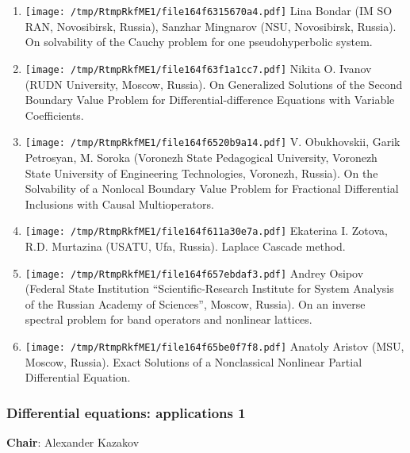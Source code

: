 \documentclass[
]{article}
\providecommand{\tightlist}{%
  \setlength{\itemsep}{0pt}\setlength{\parskip}{0pt}}
\begin{document}
\begin{enumerate}
\def\labelenumi{\arabic{enumi}.}
\tightlist
\item
  \protect\texttt{[image: /tmp/RtmpRkfME1/file164f6315670a4.pdf]}
  Lina Bondar (IM SO RAN, Novosibirsk, Russia), Sanzhar Mingnarov (NSU,
  Novosibirsk, Russia). On solvability of the Cauchy problem for one
  pseudohyperbolic system.
\item
  \protect\texttt{[image: /tmp/RtmpRkfME1/file164f63f1a1cc7.pdf]}
  Nikita O. Ivanov (RUDN University, Moscow, Russia). On Generalized
  Solutions of the Second Boundary Value Problem for
  Differential-difference Equations with Variable Coefficients.
\item
  \protect\texttt{[image: /tmp/RtmpRkfME1/file164f6520b9a14.pdf]}
  V. Obukhovskii, Garik Petrosyan, M. Soroka (Voronezh State Pedagogical
  University, Voronezh State University of Engineering Technologies,
  Voronezh, Russia). On the Solvability of a Nonlocal Boundary Value
  Problem for Fractional Differential Inclusions with Causal
  Multioperators.
\item
  \protect\texttt{[image: /tmp/RtmpRkfME1/file164f611a30e7a.pdf]}
  Ekaterina I. Zotova, R.D. Murtazina (USATU, Ufa, Russia). Laplace
  Cascade method.
\item
  \protect\texttt{[image: /tmp/RtmpRkfME1/file164f657ebdaf3.pdf]}
  Andrey Osipov (Federal State Institution ``Scientific-Research
  Institute for System Analysis of the Russian Academy of Sciences'',
  Moscow, Russia). On an inverse spectral problem for band operators and
  nonlinear lattices.
\item
  \protect\texttt{[image: /tmp/RtmpRkfME1/file164f65be0f7f8.pdf]}
  Anatoly Aristov (MSU, Moscow, Russia). Exact Solutions of a
  Nonclassical Nonlinear Partial Differential Equation.
\end{enumerate}

\hypertarget{dea1}{%
\subsubsection{Differential equations: applications 1}\label{dea1}}

\textbf{Chair}: Alexander Kazakov
\end{document}
